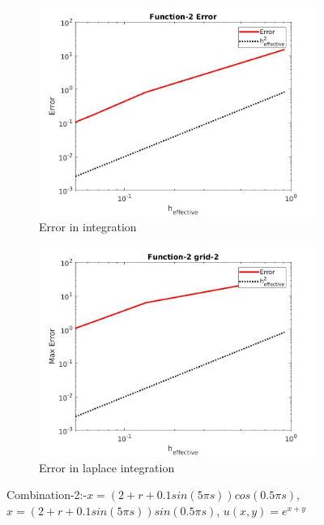 \documentclass{article}
\begin{document}
\begin{figure}
    \bigskip
    \begin{subfigure}{\textwidth}
    \centering
    \includegraphics[scale=0.33]{error-in-2.jpg}
    \caption{Error in integration}
    \label{fig:doc2}
    \end{subfigure}
    \bigskip
    \begin{subfigure}{\textwidth}
    \centering
    \includegraphics[scale=0.33]{error-inlaplace2.jpg}
    \caption{Error in laplace integration}
    \label{fig:doc3}
    \end{subfigure}
\caption{Combination-2:-$x=(2+r+0.1 sin(5\pi s))cos(0.5\pi s)$,$x=(2+r+0.1 sin(5\pi s))sin(0.5\pi s)$, $u(x,y)= e^{x+y}$}
\end{figure}
\newpage
\end{document}
